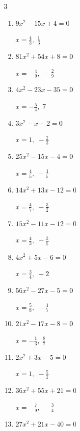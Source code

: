 \begin{multicols}{3}
\begin{enumerate}
        $\displaystyle x=-\frac{1}{5},\; \frac{3}{2}$

  \item $9x^{2}-15x+4=0$

        $\displaystyle x=\frac{4}{3},\; \frac{1}{3}$

  \item $81x^{2}+54x+8=0$

        $\displaystyle x=-\frac{4}{9},\; -\frac{2}{9}$

  \item $4x^{2}-23x-35=0$

        $\displaystyle x=-\frac{5}{4},\; 7$

\columnbreak %

  \item $3x^{2}-x-2=0$

        $\displaystyle x=1,\; -\frac{2}{3}$

  \item $25x^{2}-15x-4=0$

        $\displaystyle x=\frac{4}{5},\; -\frac{1}{5}$

  \item $14x^{2}+13x-12=0$

        $\displaystyle x=\frac{4}{7},\; -\frac{3}{2}$

  \item $15x^{2}-11x-12=0$

        $\displaystyle x=\frac{4}{3},\; -\frac{3}{5}$

  \item $4x^{2}+5x-6=0$

        $\displaystyle x=\frac{3}{4},\; -2$

  \item $56x^{2}-27x-5=0$

        $\displaystyle x=\frac{5}{8},\; -\frac{1}{7}$

  \item $21x^{2}-17x-8=0$

        $\displaystyle x=-\frac{1}{3},\; \frac{8}{7}$

  \item $2x^{2}+3x-5=0$

        $\displaystyle x=1,\; -\frac{5}{2}$

  \item $36x^{2}+55x+21=0$

        $\displaystyle x=-\frac{7}{9},\; -\frac{3}{4}$

  \item $27x^{2}+21x-40=0$


\end{enumerate}
\end{multicols}
